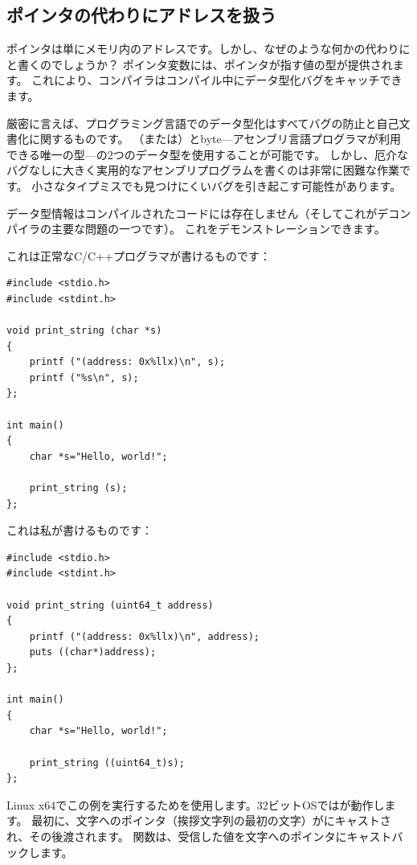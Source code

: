 \subsection{ポインタの代わりにアドレスを扱う}

ポインタは単にメモリ内のアドレスです。しかし、なぜのような何かの代わりにと書くのでしょうか？
ポインタ変数には、ポインタが指す値の型が提供されます。
これにより、コンパイラはコンパイル中にデータ型化バグをキャッチできます。

厳密に言えば、プログラミング言語でのデータ型化はすべてバグの防止と自己文書化に関するものです。
（または）とbyte---アセンブリ言語プログラマが利用できる唯一の型---の2つのデータ型を使用することが可能です。
しかし、厄介なバグなしに大きく実用的なアセンブリプログラムを書くのは非常に困難な作業です。
小さなタイプミスでも見つけにくいバグを引き起こす可能性があります。

データ型情報はコンパイルされたコードには存在しません（そしてこれがデコンパイラの主要な問題の一つです）。
これをデモンストレーションできます。

これは正常なC/C++プログラマが書けるものです：

\begin{lstlisting}[style=customc]
#include <stdio.h>
#include <stdint.h>

void print_string (char *s)
{
	printf ("(address: 0x%llx)\n", s);
	printf ("%s\n", s);
};

int main()
{
	char *s="Hello, world!";

	print_string (s);
};
\end{lstlisting}

これは私が書けるものです：

\begin{lstlisting}[style=customc]
#include <stdio.h>
#include <stdint.h>

void print_string (uint64_t address)
{
	printf ("(address: 0x%llx)\n", address);
	puts ((char*)address);
};

int main()
{
	char *s="Hello, world!";

	print_string ((uint64_t)s);
};
\end{lstlisting}

Linux x64でこの例を実行するためを使用します。32ビット\ac{OS}ではが動作します。
最初に、文字へのポインタ（挨拶文字列の最初の文字）がにキャストされ、その後渡されます。
関数は、受信した値を文字へのポインタにキャストバックします。

